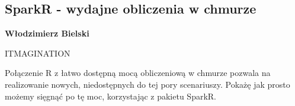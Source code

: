 \documentclass[\main/boa.tex]{subfiles}
\begin{document}
\subsection{SparkR - wydajne obliczenia w chmurze}

\begin{minipage}{0.915\textwidth}
	\centering
  {\bf {} Włodzimierz Bielski}
\end{minipage}



\begin{affiliations}
\begin{minipage}{0.915\textwidth}
\centering
ITMAGINATION  \\[-2pt]
\end{minipage}
\end{affiliations}

\vskip 0.3cm

 Połączenie R z łatwo dostępną mocą obliczeniową w chmurze pozwala na realizowanie nowych, niedostępnych do tej pory scenariuszy. Pokażę jak prosto możemy sięgnąć po tę moc, korzystając z pakietu SparkR. 
\end{document}
